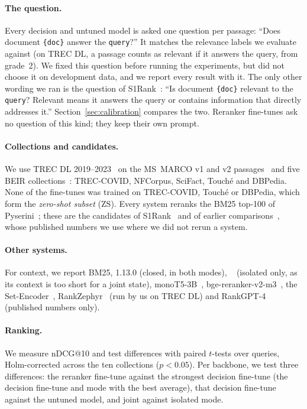 \paragraph{The question.}
Every decision and untuned model is asked one question per passage: ``Does document \texttt{\{doc\}} answer the
\texttt{query}?'' It matches the relevance labels we evaluate against (on TREC DL, a passage counts as relevant if it
answers the query, from grade~2). We fixed this question before running the experiments, but did not choose it on
development data, and we report every result with it. The only other wording we ran is the question of
S1Rank~\cite{S1Rank}: ``Is document \texttt{\{doc\}} relevant to the \texttt{query}? Relevant means it answers the
query or contains information that directly addresses it.'' Section~\ref{sec:calibration} compares the two.
Reranker fine-tunes ask no question of this kind; they keep their own prompt.

\paragraph{Collections and candidates.}
We use TREC DL
2019--2023~\cite{Craswell2020DL19,Craswell2021DL20,Craswell2021DL21,Craswell2022DL22,Craswell2023DL23} on the
MS~MARCO v1 and v2 passages~\cite{Nguyen2016MSMARCO} and five BEIR collections~\cite{Thakur2021BEIR}: TREC-COVID,
NFCorpus, SciFact, Touch\'e and DBPedia. None of the fine-tunes was trained on TREC-COVID, Touch\'e or DBPedia, which
form the \emph{zero-shot subset} (ZS). Every system reranks the BM25 top-100 of Pyserini~\cite{Lin2021Pyserini}; these
are the candidates of S1Rank~\cite{S1Rank} and of earlier
comparisons~\cite{Sun2023RankGPT,Pradeep2023RankZephyr,Abdallah2025HowGood}, whose published numbers we use where we
did not rerun a system.

\paragraph{Other systems.}
For context, we report BM25, \jev{} 1.13.0 (closed, in both modes), \laya{}~\cite{Laya} (isolated only, as its
context is too short for a joint state), monoT5-3B~\cite{Nogueira2020monoT5}, bge-reranker-v2-m3~\cite{Chen2024BGEM3},
the Set-Encoder~\cite{Schlatt2025SetEncoder}, RankZephyr~\cite{Pradeep2023RankZephyr} (run by us on TREC DL) and
RankGPT-4~\cite{Sun2023RankGPT} (published numbers only).

\paragraph{Ranking.}
We measure nDCG@10 and test differences with paired $t$-tests over queries, Holm-corrected across the ten
collections ($p < 0.05$). Per backbone, we test three differences: the reranker fine-tune against the strongest decision
fine-tune (the decision fine-tune and mode with the best average), that decision fine-tune against the untuned model,
and joint against isolated mode.

